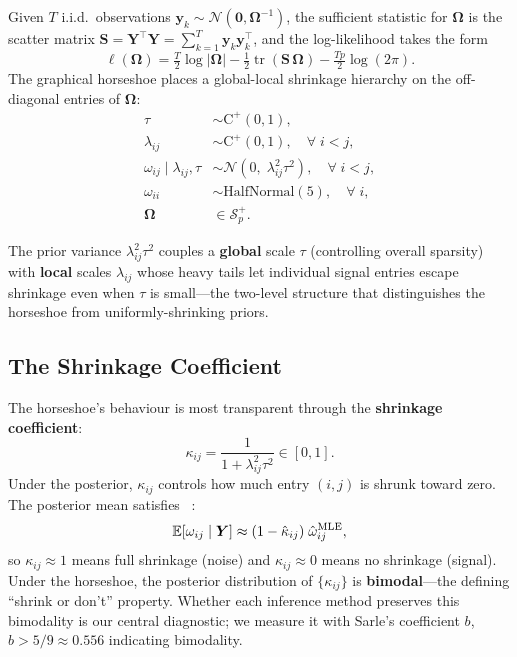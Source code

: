 \documentclass[10pt,conference,compsoc]{IEEEtran}
\newcommand{\tr}{\operatorname{tr}} \newcommand{\KL}{\operatorname{KL}} \newcommand{\ELBO}{\operatorname{ELBO}}
\newcommand{\Normal}{\mathcal{N}} \newcommand{\HalfCauchy}{\mathrm{C}^{+}} \newcommand{\InvGamma}{\mathrm{IG}}
\newcommand{\Spp}{\mathcal{S}^{+}_p} \newcommand{\bOmega}{\bm{\Omega}} \newcommand{\bSigma}{\bm{\Sigma}}
\begin{document}
Given $T$ i.i.d.\ observations $\bm{y}_k \sim \Normal(\bm{0}, \bOmega^{-1})$, the sufficient statistic for $\bOmega$ is the scatter matrix $\bm{S} = \bm{Y}^\top\bm{Y} = \sum_{k=1}^T \bm{y}_k\bm{y}_k^\top$, and the log-likelihood takes the form
\begin{equation}
  \ell(\bOmega) = \tfrac{T}{2}\log|\bOmega| - \tfrac{1}{2}\tr(\bm{S}\,\bOmega) - \tfrac{Tp}{2}\log(2\pi).
  \label{eq:loglik}
\end{equation}
The graphical horseshoe places a global-local shrinkage hierarchy on the off-diagonal entries of $\bOmega$:
\begin{align}
  \tau &\sim \HalfCauchy(0, 1), \label{eq:tau}\\
  \lambda_{ij} &\sim \HalfCauchy(0, 1), \quad \forall\; i < j, \label{eq:lam}\\
  \omega_{ij} \mid \lambda_{ij}, \tau &\sim \Normal(0,\; \lambda_{ij}^2 \tau^2), \quad \forall\; i < j, \label{eq:offdiag}\\
  \omega_{ii} &\sim \text{HalfNormal}(5), \quad \forall\; i, \label{eq:diag}\\
  \bOmega &\in \Spp. \label{eq:pd}
\end{align}

The prior variance $\lambda_{ij}^2\tau^2$ couples a \textbf{global} scale $\tau$ (controlling overall sparsity) with \textbf{local} scales $\lambda_{ij}$ whose heavy tails let individual signal entries escape shrinkage even when $\tau$ is small---the two-level structure that distinguishes the horseshoe from uniformly-shrinking priors.

\subsection{The Shrinkage Coefficient}

The horseshoe's behaviour is most transparent through the \textbf{shrinkage coefficient}:
\begin{equation}
  \kappa_{ij} = \frac{1}{1 + \lambda_{ij}^2 \tau^2} \in [0,1].
  \label{eq:kappa}
\end{equation}
Under the posterior, $\kappa_{ij}$ controls how much entry $(i,j)$ is shrunk toward zero. The posterior mean satisfies ~\cite{carvalho2010}:
\begin{equation}
  \mathbb{E}[\omega_{ij} \mid \bm{Y}] \approx (1 - \hat\kappa_{ij})\;\hat\omega_{ij}^{\text{MLE}},
  \label{eq:shrinkage-rule}
\end{equation}
so $\kappa_{ij} \approx 1$ means full shrinkage (noise) and $\kappa_{ij} \approx 0$ means no shrinkage (signal). Under the horseshoe, the posterior distribution of $\{\kappa_{ij}\}$ is \textbf{bimodal}---the defining ``shrink or don't'' property. Whether each inference method preserves this bimodality is our central diagnostic; we measure it with Sarle's coefficient $b$, $b > 5/9 \approx 0.556$ indicating bimodality.
\end{document}
